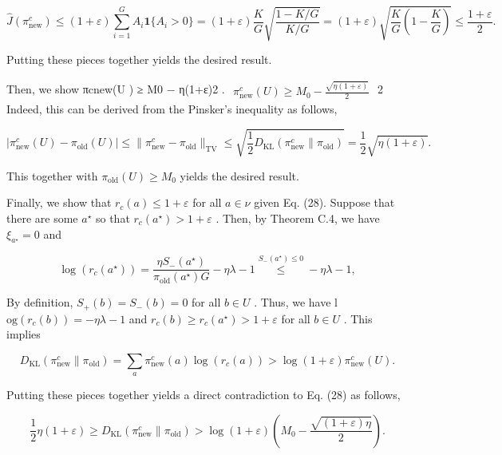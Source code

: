 \documentclass[
  10
]{article}
\begin{document}
\[
\hat {J} \left(\pi_ {\text {new}} ^ {c}\right) \leq (1 + \varepsilon) \sum_ {i = 1} ^ {G} A _ {i} \mathbf {1} \{A _ {i} > 0 \} = (1 + \varepsilon) \frac {K}{G} \sqrt {\frac {1 - K / G}{K / G}} = (1 + \varepsilon) \sqrt {\frac {K}{G} \left(1 - \frac {K}{G}\right)} \leq \frac {1 + \varepsilon}{2}.
\]

Putting these pieces together yields the desired result.

Then, we show πcnew(U ) ≥ M0 − η(1+ε)2 .
\(\begin{array} { r } { \pi _ { \mathrm { n e w } } ^ { c } ( U ) \geq M _ { 0 } - \frac { \sqrt { \eta ( 1 + \varepsilon ) } } { 2 } } \end{array}\)
2 Indeed, this can be derived from the Pinsker's inequality as follows,

\[
| \pi_ {\mathrm{new}} ^ {c} (U) - \pi_ {\mathrm{old}} (U) | \leq \| \pi_ {\mathrm{new}} ^ {c} - \pi_ {\mathrm{old}} \| _ {\mathrm{TV}} \leq \sqrt {\frac {1}{2} D _ {\mathrm{KL}} (\pi_ {\mathrm{new}} ^ {c} \| \pi_ {\mathrm{old}})} = \frac {1}{2} \sqrt {\eta (1 + \varepsilon)}.
\]

This together with \(\pi _ { \mathrm { o l d } } ( U ) \geq M _ { 0 }\)
yields the desired result.

Finally, we show that \(r _ { c } ( a ) \leq 1 + \varepsilon\) for all
\(a \in \nu\) given Eq. (28). Suppose that there are some
\(a ^ { \star }\) so that
\(r _ { c } ( a ^ { \star } ) > 1 + \varepsilon\) . Then, by Theorem
C.4, we have \(\xi _ { a ^ { \star } } = 0\) and

\[
\log (r _ {c} (a ^ {\star})) = \frac {\eta S _ {-} (a ^ {\star})}{\pi_ {\mathrm{old}} (a ^ {\star}) G} - \eta \lambda - 1 \stackrel {{S _ {-} (a ^ {\star}) \leq 0}} {{\leq}} - \eta \lambda - 1,
\]

By definition, \(S _ { + } ( b ) = S _ { - } ( b ) = 0\) for all
\(b \in U\) . Thus, we have l
\(\mathrm { o g } ( r _ { c } ( b ) ) = - \eta \lambda - 1\) and
\(r _ { c } ( b ) \geq r _ { c } ( a ^ { \star } ) > 1 + \varepsilon\)
for all \(b \in U\) . This implies

\[
D _ {\mathrm{KL}} (\pi_ {\mathrm{new}} ^ {c} \| \pi_ {\mathrm{old}}) = \sum_ {a} \pi_ {\mathrm{new}} ^ {c} (a) \log (r _ {c} (a)) > \log (1 + \varepsilon) \pi_ {\mathrm{new}} ^ {c} (U).
\]

Putting these pieces together yields a direct contradiction to Eq. (28)
as follows,

\[
\frac {1}{2} \eta (1 + \varepsilon) \geq D _ {\mathrm{KL}} (\pi_ {\mathrm{new}} ^ {c} \| \pi_ {\mathrm{old}}) > \log (1 + \varepsilon) \left(M _ {0} - \frac {\sqrt {(1 + \varepsilon) \eta}}{2}\right).
\]
\end{document}
